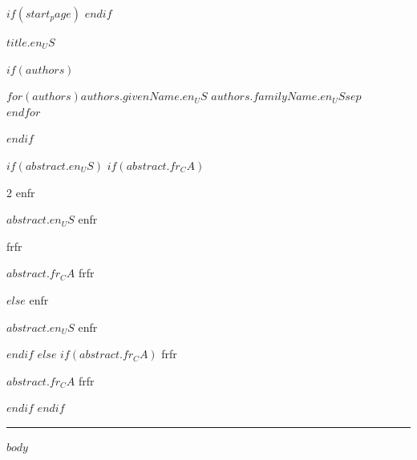 \documentclass[10pt,twoside]{article}
\newcommand{\articletitle}[1]{%
  \begin{center}
    {\color{imaginationsred}\sffamily\bfseries\fontsize{12.5}{19}\selectfont\MakeUppercase{#1}}
  \end{center}
  \vspace{6pt}
}
\newcommand{\articleauthor}[1]{%
  \begin{center}
    {\color{textgray}\sffamily\fontsize{8}{15}\selectfont\MakeUppercase{#1}}
  \end{center}
  \vspace{18pt}
}
\newenvironment{articleabstract}[1][en]{%
  \fontsize{8}{12.554}\selectfont\color{darktext}
  \def\abstractlang{#1}%
  \ifx\abstractlang\frenchlang
    \begin{otherlanguage}{french}
  \fi
}{%
  \ifx\abstractlang\frenchlang
    \end{otherlanguage}
  \fi
  \normalsize\color{black}
}
\def\frenchlang{fr}
\newcommand{\abstractlayout}[2]{%
  \begin{multicols}{2}
    \begin{articleabstract}[en]
      #1
    \end{articleabstract}
    \columnbreak
    \begin{articleabstract}[fr]
      #2
    \end{articleabstract}
  \end{multicols}
  \vspace{12pt}
}
\begin{document}
\fontsize{10}{13}\selectfont

$if(start_page)$
\setcounter{page}{$start_page$}
$endif$

\thispagestyle{firstpage}

\articletitle{$title.en_US$}

$if(authors)$
\articleauthor{$for(authors)$$authors.givenName.en_US$ $authors.familyName.en_US$$sep$ \\ $endfor$}
$endif$

$if(abstract.en_US)$
$if(abstract.fr_CA)$
\abstractlayout{$abstract.en_US$}{$abstract.fr_CA$}
$else$
\begin{articleabstract}[en]
$abstract.en_US$
\end{articleabstract}
\vspace{12pt}
$endif$
$else$
$if(abstract.fr_CA)$
\begin{articleabstract}[fr]
$abstract.fr_CA$
\end{articleabstract}
\vspace{12pt}
$endif$
$endif$

\noindent\rule{\textwidth}{0.4pt}
\vspace{12pt}

$body$
\end{document}
